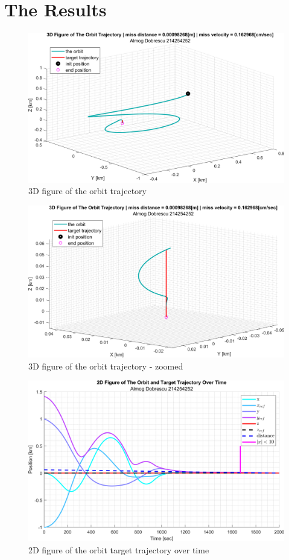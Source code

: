 \documentclass[11pt, a4paper]{article}
\begin{document}
\section{The Results}
\begin{figure}[H]
    \centering
    \includegraphics[width=1\textwidth]{images/graph1.1.png}
    \caption{3D figure of the orbit trajectory}
    \label{fig:3D-plot}
\end{figure}
\begin{figure}[H]
    \centering
    \includegraphics[width=1\textwidth]{images/graph1.2.png}
    \caption{3D figure of the orbit trajectory - zoomed}
    \label{fig:3D-plot-zoomed}
\end{figure}
\begin{figure}[H]
    \centering
    \includegraphics[width=1\textwidth]{images/graph2.png}
    \caption{2D figure of the orbit target trajectory over time}
    \label{fig:2D-plot_over_time}
\end{figure}
\end{document}
